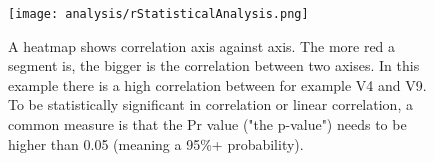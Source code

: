 







\begin{figure}[h]
    \centering
    \texttt{[image: analysis/rStatisticalAnalysis.png]}
    \caption{A heatmap shows correlation  axis against axis. The more red a segment is, the bigger is the correlation between two axises. In this example there is a high correlation between for example V4 and V9. To be statistically significant in correlation or linear correlation, a common measure is that the Pr value ("the p-value") needs to be higher than 0.05 (meaning a 95\%+ probability).}
    \label{fig:corrHeatmap}
\end{figure}

